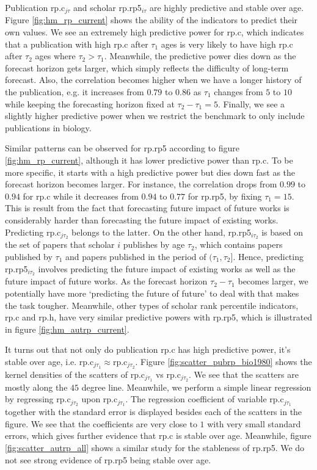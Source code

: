 Publication rp.c$_{j\tau}$ and scholar rp.rp5$_{i\tau}$ are highly predictive and stable over age. Figure \ref{fig:hm_rp_current} shows the ability of the indicators to predict their own values. We see an extremely high predictive power for rp.c, which indicates that a publication with high rp.c after $\tau_1$ ages is very likely to have high rp.c after $\tau_2$ ages where $\tau_2 > \tau_1$. Meanwhile, the predictive power dies down as the forecast horizon gets larger, which simply reflects the difficulty of long-term forecast. Also, the correlation becomes higher when we have a longer history of the publication, e.g. it increases from $0.79$ to $0.86$ as $\tau_1$ changes from $5$ to $10$ while keeping the forecasting horizon fixed at $\tau_2-\tau_1=5$. Finally, we see a slightly higher predictive power when we restrict the benchmark to only include publications in biology.

Similar patterns can be observed for rp.rp5 according to figure \ref{fig:hm_rp_current}, although it has lower predictive power than rp.c. To be more specific, it starts with a high predictive power but dies down fast as the forecast horizon becomes larger. For instance, the correlation drops from $0.99$ to $0.94$ for rp.c while it decreases from $0.94$ to $0.77$ for rp.rp5, by fixing $\tau_1=15$. This is result from the fact that forecasting future impact of future works is considerably harder than forecasting the future impact of existing works. Predicting rp.c$_{j\tau_2}$ belongs to the latter. On the other hand, rp.rp5$_{i\tau_2}$ is based on the set of papers that scholar $i$ publishes by age $\tau_2$, which contains papers published by $\tau_1$ and papers published in the period of $(\tau_1,\tau_2]$. Hence, predicting rp.rp5$_{i\tau_2}$ involves predicting the future impact of existing works as well as the future impact of future works. As the forecast horizon $\tau_2-\tau_1$ becomes larger, we potentially have more `predicting the future of future' to deal with that makes the task tougher. Meanwhile, other types of scholar rank percentile indicators, rp.c and rp.h, have very similar predictive powers with rp.rp5, which is illustrated in figure \ref{fig:hm_autrp_current}.

It turns out that not only do publication rp.c has high predictive power, it's stable over age, i.e. rp.c$_{j\tau_1}\approx$rp.c$_{j\tau_2}$. Figure \ref{fig:scatter_pubrp_bio1980} shows the kernel densities of the scatters of rp.c$_{j\tau_1}$ vs rp.c$_{j\tau_2}$. We see that the scatters are mostly along the $45$ degree line. Meanwhile, we perform a simple linear regression by regressing rp.c$_{j\tau_2}$ upon rp.c$_{j\tau_1}$. The regression coefficient of variable rp.c$_{j\tau_1}$ together with the standard error is displayed besides each of the scatters in the figure. We see that the coefficients are very close to $1$ with very small standard errors, which gives further evidence that rp.c is stable over age. Meanwhile, figure \ref{fig:scatter_autrp_all} shows a similar study for the stableness of rp.rp5. We do not see strong evidence of rp.rp5 being stable over age.

